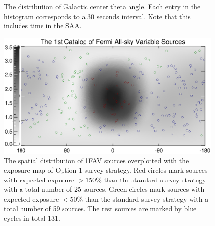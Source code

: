 \documentclass[aps,prd,superscriptaddress,showpacs,nofootinbib,fixlfloat, 12pt]{revtex4-1}
\begin{document}
\begin{figure}[t]
\begin{center}
    \vspace{-0.5cm}
  \end{center}
  \caption{The distribution of Galactic center theta angle. Each entry in the histogram corresponds to a 30 seconds interval. Note that this includes time in the SAA.} %
  \label{fig:thetaDist}
\end{figure}

\begin{figure}[t]
  \begin{center}
    \includegraphics[width=0.9\linewidth, angle=0]{plots/transient_source_map.ps}
    \vspace{-0.5cm}
  \end{center}
  \caption{The spatial distribution of 1FAV sources overplotted with the exposure map of Option 1 survey strategy. Red circles mark sources with expected exposure $>150\%$ than the standard survey strategy with a total number of 25 sources. Green circles mark sources with expected exposure $<50\%$ than the standard survey strategy with a total number of 59 sources. The rest sources are marked by blue cycles in total 131. }
  \label{fig:transmap}
\end{figure}
\end{document}
